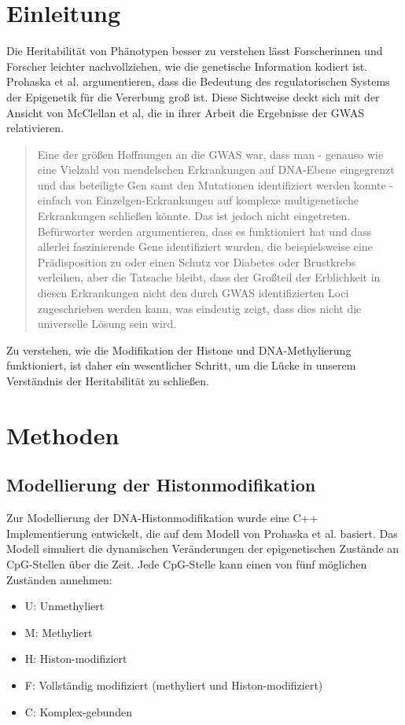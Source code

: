 \documentclass{SeminarV2}
\begin{document}
\section{Einleitung}
Die Heritabilit{\"a}t von Ph{\"a}notypen besser zu verstehen l{\"a}sst Forscherinnen und Forscher leichter
nachvollziehen, wie die genetische Information kodiert ist.
Prohaska et al. argumentieren, dass die Bedeutung des regulatorischen Systems der Epigenetik f{\"u}r die Vererbung gro{\ss} ist.
\cite{prohaska-2010}
Diese Sichtweise deckt sich mit der Ansicht von McClellan et al,
die in ihrer Arbeit die Ergebnisse der GWAS relativieren.
\begin{quote}
  \sloppy
  Eine der gr{\"o}{\ss}en Hoffnungen an die GWAS war, dass man - genauso wie eine Vielzahl von mendelschen Erkrankungen auf DNA-Ebene eingegrenzt und das beteiligte Gen samt den Mutationen identifiziert werden konnte - einfach von Einzelgen-Erkrankungen auf komplexe multigenetische Erkrankungen schlie{\ss}en k{\"o}nnte. Das ist jedoch nicht eingetreten. Bef{\"u}rworter werden argumentieren, dass es funktioniert hat und dass allerlei faszinierende Gene identifiziert wurden, die beispielsweise eine Pr{\"a}disposition zu oder einen Schutz vor Diabetes oder Brustkrebs verleihen, aber die Tatsache bleibt, dass der Gro{\ss}teil der Erblichkeit in diesen Erkrankungen nicht den durch GWAS identifizierten Loci zugeschrieben werden kann, was eindeutig zeigt, dass dies nicht die universelle L{\"o}sung sein wird.
\end{quote}
\cite{mcclellan-2010}
Zu verstehen, wie die Modifikation der Histone und DNA-Methylierung funktioniert, ist daher ein wesentlicher Schritt, um die L{\"u}cke in unserem Verst{\"a}ndnis der Heritabilit{\"a}t zu schlie{\ss}en.

\section{Methoden}
\subsection{Modellierung der Histonmodifikation}
Zur Modellierung der DNA-Histonmodifikation wurde eine C++ Implementierung entwickelt, die auf dem Modell von Prohaska et al. basiert. Das Modell simuliert die dynamischen Ver{\"a}nderungen der epigenetischen Zust{\"a}nde an CpG-Stellen {\"u}ber die Zeit. Jede CpG-Stelle kann einen von f{\"u}nf m{\"o}glichen Zust{\"a}nden annehmen:
\begin{itemize}
    \item U: Unmethyliert
    \item M: Methyliert
    \item H: Histon-modifiziert
    \item F: Vollst{\"a}ndig modifiziert (methyliert und Histon-modifiziert)
    \item C: Komplex-gebunden
\end{itemize}
\end{document}
